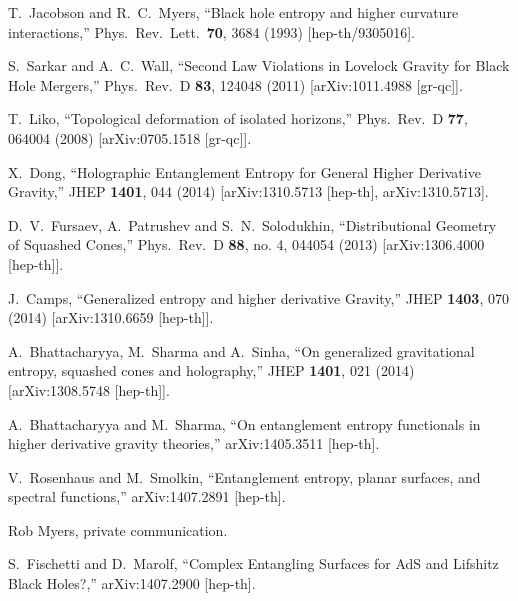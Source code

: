\documentclass[12pt]{article}
\theoremstyle{remark}
\numberwithin{equation}{section}
\numberwithin{equation}{section}
\begin{document}
\begin{thebibliography}{99}
  T.~Jacobson and R.~C.~Myers,
  ``Black hole entropy and higher curvature interactions,''
  Phys.\ Rev.\ Lett.\  {\bf 70}, 3684 (1993)
  [hep-th/9305016].

  S.~Sarkar and A.~C.~Wall,
  ``Second Law Violations in Lovelock Gravity for Black Hole Mergers,''
  Phys.\ Rev.\ D {\bf 83}, 124048 (2011)
  [arXiv:1011.4988 [gr-qc]].

  T.~Liko,
  ``Topological deformation of isolated horizons,''
  Phys.\ Rev.\ D {\bf 77}, 064004 (2008)
  [arXiv:0705.1518 [gr-qc]].

  X.~Dong,
  ``Holographic Entanglement Entropy for General Higher Derivative Gravity,''
  JHEP {\bf 1401}, 044 (2014)
  [arXiv:1310.5713 [hep-th], arXiv:1310.5713].

  D.~V.~Fursaev, A.~Patrushev and S.~N.~Solodukhin,
  ``Distributional Geometry of Squashed Cones,''
  Phys.\ Rev.\ D {\bf 88}, no. 4, 044054 (2013)
  [arXiv:1306.4000 [hep-th]].

  J.~Camps,
  ``Generalized entropy and higher derivative Gravity,''
  JHEP {\bf 1403}, 070 (2014)
  [arXiv:1310.6659 [hep-th]].

  A.~Bhattacharyya, M.~Sharma and A.~Sinha,
  ``On generalized gravitational entropy, squashed cones and holography,''
  JHEP {\bf 1401}, 021 (2014)
  [arXiv:1308.5748 [hep-th]].


  A.~Bhattacharyya and M.~Sharma,
  ``On entanglement entropy functionals in higher derivative gravity theories,''
  arXiv:1405.3511 [hep-th].


  V.~Rosenhaus and M.~Smolkin,
  ``Entanglement entropy, planar surfaces, and spectral functions,''
  arXiv:1407.2891 [hep-th].

Rob Myers, private communication.

  S.~Fischetti and D.~Marolf,
  ``Complex Entangling Surfaces for AdS and Lifshitz Black Holes?,''
  arXiv:1407.2900 [hep-th].


\end{thebibliography}
\end{document}
